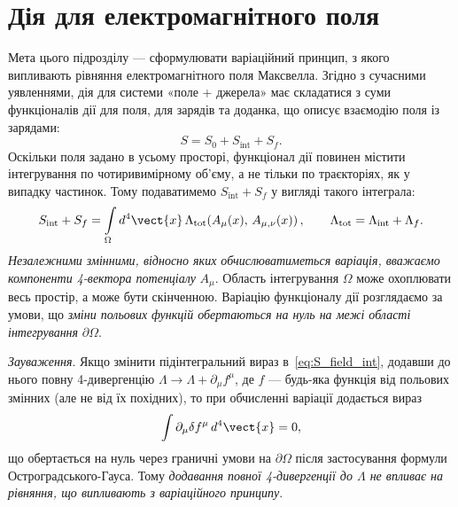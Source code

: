 \section{Дія для електромагнітного поля}

Мета цього підрозділу --- сформулювати варіаційний принцип, з якого випливають рівняння електромагнітного поля Максвелла. Згідно з сучасними уявленнями, дія для системи «поле + джерела» має складатися з суми функціоналів дії для поля, для зарядів та доданка, що описує взаємодію поля із зарядами:
\begin{equation}\label{eq:S_total}
    S = S_0 + S_{\text{int}} + S_f.
\end{equation}
Оскільки поля задано в усьому просторі, функціонал дії повинен містити інтегрування по чотиривимірному об'єму, а не тільки по траєкторіях, як у випадку частинок. Тому подаватимемо $S_{\text{int}}+S_f$ у вигляді такого інтеграла:
\begin{equation}\label{eq:S_field_int}
    S_{\text{int}} + S_f
    = \int\limits_{\Omega} d^4\vect{x}\,\Lambda_{\text{tot}}\!\left(A_{\mu}(x),\,A_{\mu,\nu}(x)\right),
    \qquad \Lambda_{\text{tot}} = \Lambda_{\text{int}} + \Lambda_f.
\end{equation}
\emph{Незалежними змінними, відносно яких обчислюватиметься варіація, вважаємо компоненти 4-вектора потенціалу} $A_{\mu}$. Область інтегрування $\Omega$ може охоплювати весь простір, а може бути скінченною. Варіацію функціоналу дії розглядаємо за умови, що \emph{зміни польових функцій обертаються на нуль на межі області інтегрування} $\partial\Omega$.

\textit{Зауваження}. Якщо змінити підінтегральний вираз в~\eqref{eq:S_field_int}, додавши до нього повну 4-дивергенцію $\Lambda\to\Lambda+\partial_{\mu}f^{\mu}$, де $f$ --- будь-яка функція від польових змінних (але не від їх похідних), то при обчисленні варіації додається вираз
\begin{equation*}
    \int\partial_{\mu}\delta f^{\mu}\,d^4\vect{x} = 0,
\end{equation*}
що обертається на нуль через граничні умови на $\partial\Omega$ після застосування формули Остроградського-Гауса. Тому \emph{додавання повної 4-дивергенції до $\Lambda$ не впливає на рівняння, що випливають з варіаційного принципу}.

